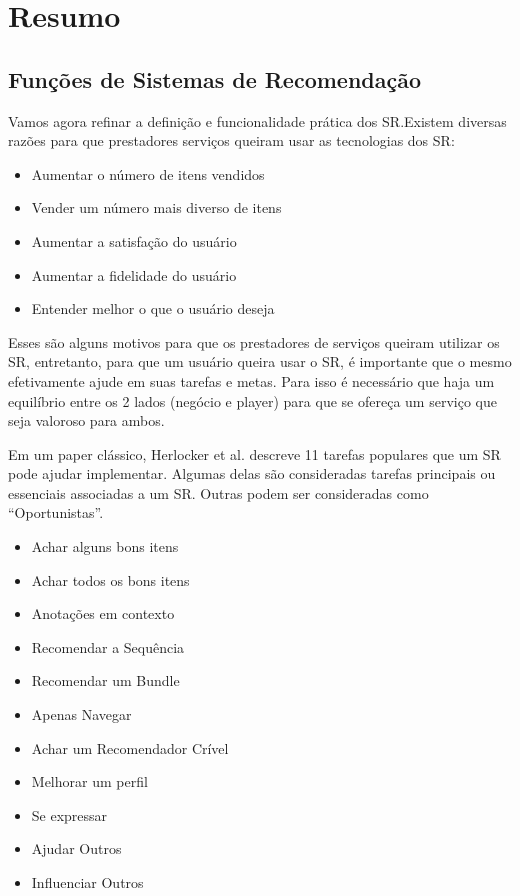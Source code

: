 \section{Resumo}

\subsection{Funções de Sistemas de Recomendação}
Vamos agora refinar a definição e funcionalidade prática dos SR.Existem diversas razões para que prestadores serviços queiram usar as tecnologias dos SR:

\begin{itemize}

  \item Aumentar o número de itens vendidos
  \item Vender um número mais diverso de itens
  \item Aumentar a satisfação do usuário
  \item Aumentar a fidelidade do usuário
  \item Entender melhor o que o usuário deseja

\end{itemize}

\par

Esses são alguns motivos para que os prestadores de serviços queiram utilizar os SR, entretanto, para que um usuário queira usar o SR, é importante que o mesmo efetivamente ajude em suas tarefas e metas. Para isso é necessário que haja um equilíbrio entre os 2 lados (negócio e player) para que se ofereça um serviço que seja valoroso para ambos.

\par

Em um paper clássico, Herlocker et al. descreve 11 tarefas populares que um SR pode ajudar implementar. Algumas delas são consideradas tarefas principais ou essenciais associadas a um SR. Outras podem ser consideradas como ``Oportunistas''.

\begin{itemize}

  \item Achar alguns bons itens
  \item Achar todos os bons itens
  \item Anotações em contexto
  \item Recomendar a Sequência
  \item Recomendar um Bundle
  \item Apenas Navegar
  \item Achar um Recomendador Crível
  \item Melhorar um perfil
  \item Se expressar
  \item Ajudar Outros
  \item Influenciar Outros

\end{itemize}

